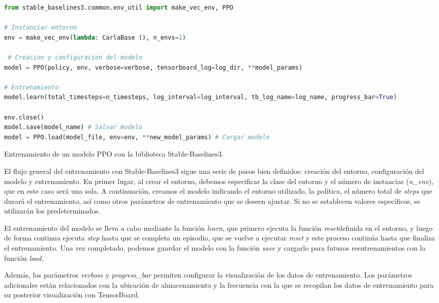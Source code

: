 \begin{code}[h] \begin{lstlisting}[language=Python] 
from stable_baselines3.common.env_util import make_vec_env, PPO

# Instanciar entorno
env = make_vec_env(lambda: CarlaBase (), n_envs=1) 

 # Creacion y configuracion del modelo
model = PPO(policy, env, verbose=verbose, tensorboard_log=log_dir, **model_params)

# Entrenamiento
model.learn(total_timesteps=n_timesteps, log_interval=log_interval, tb_log_name=log_name, progress_bar=True) 

env.close()
model.save(model_name) # Salvar modelo
model = PPO.load(model_file, env=env, **new_model_params) # Cargar modelo
\end{lstlisting}
\caption[Ejemplo de código con Stable-Baselines3]{Entrenamiento de un modelo \ac{PPO} con la biblioteca Stable-Baselines3.} 
\label{cod:sb3} \end{code} 

El flujo general del entrenamiento con Stable-Baselines3 sigue una serie de pasos bien definidos: creación del entorno, configuración del modelo y entrenamiento. En primer lugar, al crear el entorno, debemos especificar la clase del entorno y el número de instancias (\textit{n\_env}), que en este caso será una sola. A continuación, creamos el modelo indicando el entorno utilizado, la política, el número total de \textit{steps} que durará el entrenamiento, así como otros parámetros de entrenamiento que se deseen ajustar. Si no se establecen valores específicos, se utilizarán los predeterminados.

El entrenamiento del modelo se lleva a cabo mediante la función \textit{learn}, que primero ejecuta la función \textit{reset}definida en el entorno, y luego de forma continua ejecuta \textit{step} hasta que se completa un episodio, que se vuelve a ejecutar \textit{reset} y este proceso continúa hasta que finaliza el entrenamiento. Una vez completado, podemos guardar el modelo con la función \textit{save} y cargarlo para futuros reentrenamientos con la función \textit{load}.

Además, los parámetros \textit{verbose} y \textit{progress\_bar} permiten configurar la visualización de los datos de entrenamiento. Los parámetros adicionales están relacionados con la ubicación de almacenamiento y la frecuencia con la que se recopilan los datos de entrenamiento para su posterior visualización con TensorBoard.


